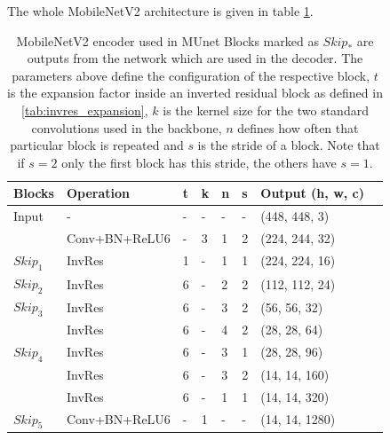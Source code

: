 
The whole MobileNetV2 architecture is given in table \ref{tab:mobilenetv2_architecture}.

\begin{table} %
\begin{center}

\begin{tabular}{l|l|l|l|l|l|l|l}
\textbf{Blocks} & \textbf{Operation} & \textbf{t} & \textbf{k} & \textbf{n} & \textbf{s} & \textbf{Output (h, w, c)}\\
\hline
Input           & -             & - & - & - & - & (448, 448, 3)  \\
                & Conv+BN+ReLU6 & - & 3 & 1 & 2 & (224, 244, 32) \\
$Skip_{1}$      & InvRes        & 1 & - & 1 & 1 & (224, 224, 16) \\
$Skip_{2}$      & InvRes        & 6 & - & 2 & 2 & (112, 112, 24) \\
$Skip_{3}$      & InvRes        & 6 & - & 3 & 2 & (56, 56, 32)   \\
                & InvRes        & 6 & - & 4 & 2 & (28, 28, 64)   \\
$Skip_{4}$      & InvRes        & 6 & - & 3 & 1 & (28, 28, 96)   \\
                & InvRes        & 6 & - & 3 & 2 & (14, 14, 160)  \\
                & InvRes        & 6 & - & 1 & 1 & (14, 14, 320)  \\
$Skip_{5}$      & Conv+BN+ReLU6 & - & 1 & - & - & (14, 14, 1280) \\
\end{tabular}

\caption{MobileNetV2 encoder used in \ac{MUnet} Blocks marked as $Skip_*$ are outputs from the network which are used in the decoder. The parameters above define the configuration of the respective block, $t$ is the expansion factor inside an inverted residual block as defined in \ref{tab:invres_expansion}, $k$ is the kernel size for the two standard convolutions used in the backbone, $n$ defines how often that particular block is repeated and $s$ is the stride of a block. Note that if $s = 2$ only the first block has this stride, the others have $s = 1$.}
\label{tab:mobilenetv2_architecture}
\end{center}
\end{table}

